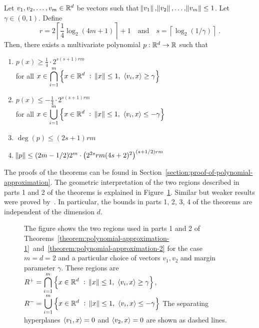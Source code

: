 \begin{theorem}
\label{theorem:polynomial-approximation-2}
Let $v_1, v_2, \dots, v_m \in \mathbb{R}^d$ be vectors such that $\norm{v_1},
\norm{v_2}, \dots, \norm{v_m} \le 1$. Let $\gamma \in (0,1)$.
Define
$$
r = 2 \left\lceil \frac{1}{4} \log_2(4m + 1) \right\rceil + 1 \quad \text{and} \quad s = \left \lceil \log_2(1/\gamma) \right \rceil \; .
$$
Then, there exists a multivariate polynomial $p:\mathbb{R}^d \to \mathbb{R}$ such that
\begin{enumerate}
\item $\displaystyle p(x) \ge \frac{1}{4} \cdot 2^{s(s+1)rm}$ \\
for all $\displaystyle x \in \bigcap_{i=1}^m \left\{ x \in \mathbb{R}^d ~:~ \norm{x} \le 1, \ \left\langle v_i, x \right\rangle \ge \gamma \right\}$

\item $\displaystyle p(x) \le - \frac{1}{4} \cdot 2^{s(s+1)rm}$ \\
for all $\displaystyle x \in \bigcup_{i=1}^m \left\{ x \in \mathbb{R}^d ~:~ \norm{x} \le 1, \ \left\langle v_i, x \right\rangle \le - \gamma \right\}$

\item $\deg(p) \le (2s+1) rm$
\item $\norm{p} \le (2m-1/2) 2^m \cdot \left(2^{2s} rm (4s+2)^2 \right)^{(s+1/2)rm}$
\end{enumerate}
\end{theorem}


The proofs of the theorems can be found in
Section~\ref{section:proof-of-polynomial-approximation}. The geometric
interpretation of the two regions described in parts 1 and 2 of the theorems is
explained in Figure~\ref{figure:pizza-slice}. Similar but weaker results were
proved by~\cite{Klivans-Servedio-2008}. In particular, the bounds in parts
1, 2, 3, 4 of the theorems are independent of the dimension $d$.

\begin{figure}
\begin{center}

\end{center}
\caption[]{The figure shows the two regions used in parts 1 and 2 of
Theorems~\ref{theorem:polynomial-approximation-1}~and~\ref{theorem:polynomial-approximation-2}
for the case $m=d=2$ and a particular choice of vectors $v_1, v_2$ and margin
parameter $\gamma$. These regions are
$R^+ = \displaystyle \bigcap_{i=1}^m \left\{ x \in \mathbb{R}^d ~:~ \norm{x} \le 1, \ \left\langle v_i, x \right\rangle \ge \gamma \right\}$,
$R^- = \displaystyle \bigcup_{i=1}^m \left\{ x \in \mathbb{R}^d ~:~ \norm{x} \le 1, \ \left\langle v_i, x \right\rangle \le - \gamma \right\}$
The separating hyperplanes $\left\langle v_1, x \right\rangle = 0$ and $\left\langle v_2, x \right\rangle = 0$ are shown as dashed lines.}
\label{figure:pizza-slice}
\end{figure}

